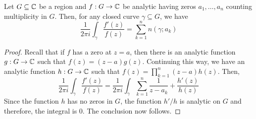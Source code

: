 \begin{theorem}
    Let $G\subseteq\mathbb{C}$ be a region and $f: G\to\mathbb{C}$ be analytic having zeros $a_1,\ldots,a_n$ counting multiplicity in $G$. Then, for any closed curve $\gamma\subseteq G$, we have
    \begin{equation*}
        \frac{1}{2\pi i}\int_\gamma\frac{f'(z)}{f(z)} = \sum_{k = 1}^n n(\gamma;a_k)
    \end{equation*}
\end{theorem}
\begin{proof}
    Recall that if $f$ has a zero at $z = a$, then there is an analytic function $g: G\to\mathbb{C}$ such that $f(z) = (z - a)g(z)$. Continuing this way, we have an analytic function $h: G\to\mathbb{C}$ such that $f(z) = \prod_{k = 1}^n (z - a) h(z)$. Then, 
    \begin{equation*}
        \frac{1}{2\pi i}\int_{\gamma}\frac{f'(z)}{f(z)} = \frac{1}{2\pi i}\int_{\gamma}\sum_{k = 1}^n\frac{1}{z - a_k} + \frac{h'(z)}{h(z)}
    \end{equation*}
    Since the function $h$ has no zeros in $G$, the function $h'/h$ is analytic on $G$ and therefore, the integral is $0$. The conclusion now follows.
\end{proof}
